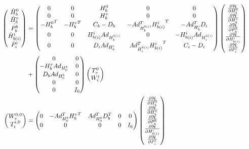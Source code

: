 \documentclass[a4paper,twoside, openright,12pt]{report}
\begin{document}
\begin{eqnarray}
\resizebox{1\hsize}{!}{$
\begin{aligned}
\begin{pmatrix}\dot{H}_b^0 \\ \dot{H}_b^v \\  \dot{P_b^b} \\ \dot{H}_{b(i)}^i \\ \dot{P}_i^i\end{pmatrix}
 &=
\begin{pmatrix} 0 & 0 & H_b^0 & 0 & 0\\ 0 & 0 & H_b^v & 0 & 0 \\
- {H_b^0}^T & -{H_b^v}^T & C_b-D_b & -Ad_{H_b^{b(i)}}^T {H_{b(i)}^i}^T & -Ad_{H_b^i}^T D_i \\
0 & 0 & H_{b(i)}^i Ad_{H_b^{b(i)}} & 0 & -H_{b(i)}^i Ad_{H_i^{b(i)}} \\ 0 & 0 & D_i Ad_{H_b^i} & Ad_{H_i^{b(i)}}^T {H_{b(i)}^i}^T & C_i - D_i\end{pmatrix}
\begin{pmatrix}\frac{\partial \mathcal{H}}{\partial H_b^0}\\ \frac{\partial \mathcal{H}}{\partial H_b^v} \\ \frac{\partial \mathcal{H}}{\partial P_b^b} \\ \frac{\partial \mathcal{H}}{\partial H_{b(i)}^i} \\ 
\frac{\partial \mathcal{H}}{\partial P_{i}^i}\end{pmatrix} \\
&+
\begin{pmatrix}
0 & 0 \\
-H_b^v Ad_{H_0^b} & 0 \\
D_b Ad_{H_0^b} & 0 \\
0 & 0 \\
0 & I_6
\end{pmatrix}
\begin{pmatrix}
T_v^0 \\ W_i^i
\end{pmatrix}
\\
\begin{pmatrix}
W_v^{0,0} \\ T_i^{i,0}
\end{pmatrix}
&=
\begin{pmatrix}
0 & -Ad_{H_0^b}^T  {H_b^v}^T & Ad_{H_0^b}^T D_b^T & 0 & 0 \\
0 & 0 & 0 & 0 & I_6
\end{pmatrix}
\begin{pmatrix}\frac{\partial \mathcal{H}}{\partial H_b^0}\\ \frac{\partial \mathcal{H}}{\partial H_b^v} \\ \frac{\partial \mathcal{H}}{\partial P_b^b} \\ \frac{\partial \mathcal{H}}{\partial H_{b(i)}^i} \\ 
\frac{\partial \mathcal{H}}{\partial P_{i}^i}\end{pmatrix}
\end{aligned}
$}
\end{eqnarray}
\end{document}

